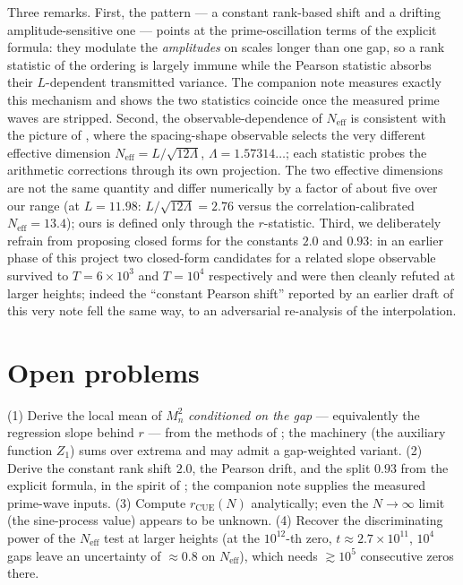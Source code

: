 \documentclass[12pt]{amsart}
\begin{document}
Three remarks. First, the pattern --- a constant rank-based shift and a
drifting amplitude-sensitive one --- points at the prime-oscillation terms
of the explicit formula: they modulate the \emph{amplitudes} on scales
longer than one gap, so a rank statistic of the ordering is largely immune
while the Pearson statistic absorbs their $L$-dependent transmitted
variance. The companion note \cite{companion2} measures exactly this
mechanism and shows the two statistics coincide once the measured prime
waves are stripped. Second, the observable-dependence of
$N_{\mathrm{eff}}$ is consistent with the picture of \cite{BBLM06}, where
the spacing-shape observable selects the very different effective
dimension $N_{\mathrm{eff}} = L/\sqrt{12\Lambda}$,
$\Lambda = 1.57314\ldots$; each statistic probes the arithmetic
corrections through its own projection. The two effective dimensions are
not the same quantity and differ numerically by a factor of about five
over our range (at $L = 11.98$: $L/\sqrt{12\Lambda} = 2.76$ versus the
correlation-calibrated $N_{\mathrm{eff}} = 13.4$); ours is defined only
through the $r$-statistic. Third, we deliberately refrain
from proposing closed forms for the constants $2.0$ and $0.93$: in an
earlier phase of this project two closed-form candidates for a related
slope observable survived to $T = 6\times10^3$ and $T = 10^4$ respectively
and were then cleanly refuted at larger heights; indeed the ``constant
Pearson shift'' reported by an earlier draft of this very note fell the
same way, to an adversarial re-analysis of the interpolation.

\section{Open problems}

(1) Derive the local mean of $M_n^2$ \emph{conditioned on the gap} ---
equivalently the regression slope behind $r$ --- from the methods of
\cite{CG85, HLPC24}; the machinery (the auxiliary function $Z_1$) sums over
extrema and may admit a gap-weighted variant.
(2) Derive the constant rank shift $2.0$, the Pearson drift, and the split
$0.93$ from the explicit formula, in the spirit of \cite{BBLM06}; the
companion note \cite{companion2} supplies the measured prime-wave inputs.
(3) Compute $r_{\mathrm{CUE}}(N)$ analytically; even the $N\to\infty$
limit (the sine-process value) appears to be unknown.
(4) Recover the discriminating power of the $N_{\mathrm{eff}}$ test at
larger heights (at the $10^{12}$-th zero, $t \approx 2.7\times10^{11}$,
$10^4$ gaps leave an uncertainty of $\approx 0.8$ on $N_{\mathrm{eff}}$),
which needs $\gtrsim 10^5$ consecutive zeros there.
\end{document}
